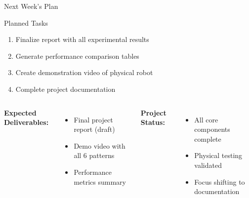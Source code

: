 \documentclass[aspectratio=169, 11pt]{beamer}
\begin{document}
\begin{frame}{Next Week's Plan}
    \begin{block}{Planned Tasks}
        \begin{enumerate}
            \item Finalize report with all experimental results
            \item Generate performance comparison tables
            \item Create demonstration video of physical robot
            \item Complete project documentation
        \end{enumerate}
    \end{block}
    
    \vspace{5mm}
    
    \begin{columns}[T]
        \textbf{Expected Deliverables:}
        \begin{itemize}
            \item Final project report (draft)
            \item Demo video with all 6 patterns
            \item Performance metrics summary
        \end{itemize}
        
        \textbf{Project Status:}
        \begin{itemize}
            \item All core components complete
            \item Physical testing validated
            \item Focus shifting to documentation
        \end{itemize}
    \end{columns}
\end{frame}
\end{document}
